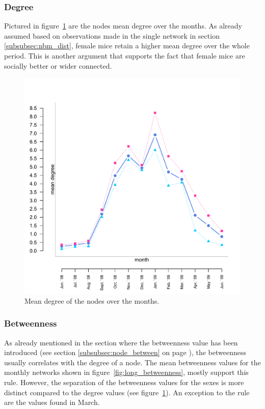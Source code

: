 \subsubsection{Degree}

Pictured in figure~\ref{fig:long_degree} are the nodes mean degree over the months. As already assumed based on observations made in the single network in section \ref{subsubsec:nbm_dist}, female mice retain a higher mean degree over the whole period. This is another argument that supports the fact that female mice are socially better or wider connected.

\begin{figure}[htpb]
\begin{center}
  \includegraphics[width=.6\textwidth]{assets/pdf/long_degree.pdf}
  \caption[Mean degree of the nodes over the months]{Mean degree of the nodes over the months.}
  \label{fig:long_degree}
\end{center}
\end{figure} 


\subsubsection{Betweenness}
\label{subsubsec:long_betweenness}

As already mentioned in the section where the betweenness value has been introduced (see section \ref{subsubsec:node_between} on page \pageref{subsubsec:node_between}), the betweenness usually correlates with the degree of a node. The mean betweenness values for the monthly networks shown in figure~\ref{fig:long_betweenness}, mostly support this rule. However, the separation of the betweenness values for the sexes is more distinct compared to the degree values (see figure~\ref{fig:long_degree}). An exception to the rule are the values found in March.   

